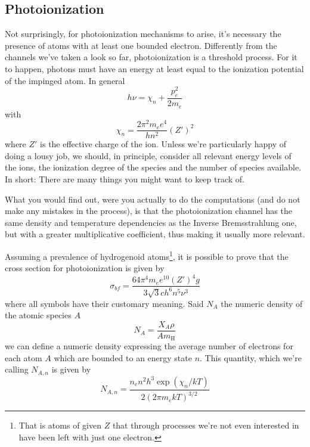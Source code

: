 \subsection{Photoionization}
Not surprisingly, for photoionization mechanisms to arise, it's necessary the presence of atoms with at least one bounded electron. Differently from the channels we've taken a look so far, photoionization is a threshold process. For it to happen, photons must have an energy at least equal to the ionization potential of the impinged atom. In general
\begin{equation*}
	h\nu = \chi_{n} + \frac{p_{e}^{2}}{2m_{e}}
\end{equation*}
with 
\begin{equation*}
	\chi_{n} = \frac{2\pi^{2}m_{e}e^{4}}{hn^{2}}(Z')^{2}
\end{equation*}
where $Z'$ is the effective charge of the ion. Unless we're particularly happy of doing a lousy job, we should, in principle, consider all relevant energy levels of the ions, the ionization degree of the species and the number of species available. In short: There are many things you might want to keep track of.
\par What you would find out, were you actually to do the computations (and do not make any mistakes in the process), is that the photoionization channel has the same density and temperature dependencies as the Inverse Bremsstrahlung one, but with a greater multiplicative coefficient, thus making it usually more relevant.
\par Assuming a prevalence of hydrogenoid atoms\footnote{That is atoms of given $Z$ that through processes we're not even interested in have been left with just one electron.}, it is possible to prove that the cross section for photoionization is given by 
\begin{equation}
	\sigma_{bf} = \frac{64\pi^{4}m_{e}e^{10}(Z')^{4}g}{3\sqrt{3}ch^{6}n^{5}\nu^{3}}
	\label{eq:photoionizationcrosssection}
\end{equation}
where all symbols have their customary meaning. Said $N_{A}$ the numeric density of the atomic species $A$
\begin{equation*}
	N_{A} = \frac{X_{A}\rho}{A m_{\text{H}}}
\end{equation*}
we can define a numeric density expressing the average number of electrons for each atom $A$ which are bounded to an energy state $n$. This quantity, which we're calling $N_{A,n}$ is given by 
\begin{equation*}
	N_{A,n} = \frac{n_{e}n^{2}h^{3}\exp(\chi_{n}/kT)}{2(2\pi m_{e}kT)^{3/2}}
\end{equation*}
